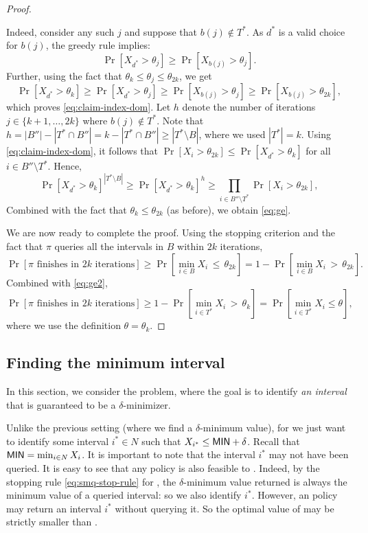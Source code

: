 \documentclass[11pt]{article}
\theoremstyle{remark}
\theoremstyle{plain}
\theoremstyle{remark}
\begin{document}
\begin{proof}
\begin{itemize}
Indeed, consider any such $j$ and suppose that $b(j)\not\in T^*$. As $d^*$ is a valid choice for $b(j)$, the greedy rule implies:
$$\Pr\left[X_{d^*} > \theta_j\right] \ge \Pr\left[X_{b(j)} > \theta_j\right]. $$
Further, using the fact that $\theta_k \le \theta_j\le \theta_{2k}$, we get 
$$\Pr\left[X_{d^*} > \theta_k\right] \ge\Pr\left[X_{d^*} > \theta_j\right] \ge \Pr\left[X_{b(j)} > \theta_j\right] \ge \Pr\left[X_{b(j)} > \theta_{2k}\right] , $$
which proves \eqref{eq:claim-index-dom}. Let $h$ denote the number of iterations $j\in \{k+1,\dots, 2k\}$  where $b(j)\not\in T^*$. Note that $h=|B''| - |T^*\cap B''|= k - |T^*\cap B''| \ge |T^*\setminus B|$, where we used $|T^*|=k$. Using \eqref{eq:claim-index-dom}, it follows that $\Pr[X_{i} > \theta_{2k}] \leq \Pr[X_{d^*} > \theta_{k}]$ for all $i\in B''\setminus T^*$. Hence,
\[
 \Pr[X_{d^*} > \theta_{k}]^{|T^*\setminus B|}  \ge \Pr[X_{d^*} > \theta_{k}]^h  \ge  \prod_{i\in B'' \setminus T^*} \Pr[X_{i} > \theta_{2k}], 
\]
Combined with the fact that $\theta_k \leq \theta_{2k}$  (as before), we obtain  \eqref{eq:ge}.
\end{itemize}

We are now ready to complete the proof. Using the \smq stopping criterion and the fact that $\pi$ queries all the intervals in $B$ within $2k$ iterations, 
$$\Pr[\pi \text{ finishes in }2k \text{ iterations}] \ge \Pr\left[\min_{i \in B}  X_i \, \le\, \theta_{2k}\right]   = 1-\Pr\left[\min_{i \in B}  X_i \, >\, \theta_{2k}\right].$$ 
Combined with \eqref{eq:ge2}, 
$$\Pr[\pi \text{ finishes in }2k \text{ iterations}] \ge 1-  \Pr\left[\min_{i \in T^*} X_i \, >\, \theta_k\right]  =  \Pr\left[\min_{i \in T^*} X_i  \le  \theta\right],$$
where we use the definition $\theta=\theta_k$.
 \end{proof}


\noindent




\subsection{Finding the minimum interval}
\label{subsec:unit-smqi} 
In this section, we consider the \smqi problem,   where the goal is to identify  \emph{an interval} that is guaranteed to be a $\delta$-minimizer. 

Unlike the previous \smq setting (where we find a  $\delta$-minimum value), for \smqi  we just want to identify some interval $i^*\in N$ such that $X_{i^*}\le {\sf MIN} +\delta$. Recall that ${\sf MIN}=\min_{i\in N} X_i$. It is important to note that the interval $i^*$ may not have been queried.  It is easy to see that any \smq policy is also feasible to \smqi. Indeed, by the stopping rule \eqref{eq:smq-stop-rule} for \smq, the $\delta$-minimum value returned is always the minimum value of a queried interval: so we also identify $i^*$. However, an \smqi policy may return an interval $i^*$ without querying it. So the optimal value of \smqi may be strictly smaller than \smq. 
\end{document}
